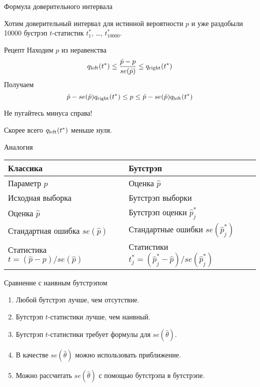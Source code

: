 \begin{frame}{Формула доверительного интервала}

Хотим доверительный интервал для истинной вероятности $p$ и уже раздобыли 10000 бустрэп $t$-статистик $t^*_1$, \ldots, $t^*_{10000}$.
  
\pause
\begin{block}{Рецепт}
Находим $p$ из неравенства
\[
q_{\text{left}}(t^*) \leq \frac{\hat p - p}{se(\hat p)} \leq q_{\text{right}}(t^*)    
\]
Получаем 
\[
\hat p  - se(\hat p) q_{\text{right}}(t^*) \leq p \leq \hat p - se(\hat p) q_{\text{left}}(t^*)      
\]
\end{block}

\pause
\alert{Не пугайтесь минуса справа!} 

Скорее всего $q_{\text{left}}(t^*)$ меньше нуля. 

\end{frame}
      

\begin{frame}{Аналогия}

\begin{tabular}{@{}ll@{}}
  \toprule
Классика & Бутстрэп \\ 
\midrule
Параметр $p$ & Оценка $\hat p$ \\
\midrule
Исходная выборка & Бутстрэп выборки \\
Оценка $\hat p$ & Бутстрэп оценки $\hat p^*_j$ \\
Стандартная ошибка $se(\hat p)$ & Стандартные ошибки $se(\hat p^*_j)$  \\
Статистика $t = (\hat p - p) /se(\hat p)$ & Статистики $t^*_j = (\hat p^*_j - \hat p) /se(\hat p^*_j)$ \\
\bottomrule
\end{tabular}


\end{frame}



\begin{frame}{Сравнение с наивным бутстрэпом}

\begin{enumerate}[<+->]
  \item Любой бутстрэп лучше, чем отсутствие.
  \item Бутстрэп $t$-статистики лучше, чем наивный.
  \item Бутстрэп $t$-статистики требует формулы для $se(\hat \theta)$.
  \item В качестве $se(\hat \theta)$ можно использовать приближение. 
  \item Можно рассчитать $se(\hat \theta)$ с помощью бутстрэпа в бутстрэпе.
\end{enumerate}

\end{frame}
  
